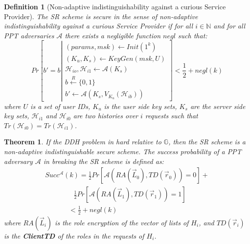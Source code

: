 \documentclass[epsfig,a4paper,11pt,titlepage]{book}
\newtheorem{definition}{Definition}
\newtheorem{theorem}{Theorem}
\numberwithin{algorithm}{chapter}
\begin{document}
\begin{definition}[Non-adaptive indistinguishability against a curious Service Provider]
The \gls{SR} scheme is secure in the sense of non-adaptive indistinguishability against a curious Service Provider if for all $i \in \mathbb{N}$ and for all \gls{PPT} adversaries $\mathcal{A}$ there exists a negligible function $negl$ such that:
\begin{equation}
Pr \left[ b'=b \left|
\begin{array}{lll}
(params, msk) \leftarrow Init(1^k)\\
(K_u, K_s) \leftarrow KeyGen(msk, U)\\
\mathcal{H}_{io},\mathcal{H}_{i1} \leftarrow \mathcal{A}(K_s)\\
b \xleftarrow{R} \{0,1\}\\
b' \leftarrow \mathcal{A}(K_s, V_{K_u}(\mathcal{H}_{ib}))
\end{array}
\right] < \frac{1}{2} + negl(k)
\right.
\end{equation}
where $U$ is a set of user IDs, $K_u$ is the user side key sets, $K_s$ are the server side key sets, $\mathcal{H}_{i1}$ and $\mathcal{H}_{i0}$ are two histories over $i$ requests such that $Tr(\mathcal{H}_{i0}) = Tr(\mathcal{H}_{i1})$.
\end{definition}

\begin{theorem}\label{thm:3}
If the \gls{DDH} problem in hard relative to $\mathbb{G}$, then the \gls{SR} scheme is a non-adaptive indistinguishable secure scheme. The success probability of a \gls{PPT} adversary $\mathcal{A}$ in breaking the \gls{SR} scheme is defined as:
\begin{equation}
\begin{array}{l}
Succ^{\mathcal{A}}(k) = \frac{1}{2} Pr[\mathcal{A}(RA(\vec{L}_0), TD(\vec{r}_0)) = 0] + \\
\hspace{50pt} \frac{1}{2} Pr[\mathcal{A}(RA(\vec{L}_1), TD(\vec{r}_1)) = 1] \\
\hspace{41pt} < \frac{1}{2} + negl(k)
\end{array}
\end{equation}
where $RA(\vec{L}_i)$ is the role encryption of the vector of lists of $H_i$, and $TD(\vec{r}_i)$ is the \textbf{ClientTD} of the roles in the requests of $H_i$.
\end{theorem}
\end{document}

